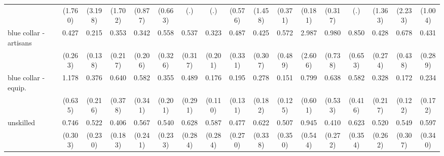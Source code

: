{\begin{tabular}{l*{16}{c}}
                    &     (1.760)         &     (3.198)         &     (1.702)         &     (0.877)         &     (0.663)         &         (.)         &         (.)         &     (0.576)         &     (1.458)         &     (0.371)         &     (0.181)         &     (0.317)         &         (.)         &     (1.363)         &     (2.233)         &     (1.004)         \\
[1em]
blue collar - artisans&       0.427         &       0.215\sym{*}  &       0.353         &       0.342         &       0.558         &       0.537         &       0.323         &       0.487         &       0.425         &       0.572         &       2.987         &       0.980         &       0.850         &       0.428         &       0.678         &       0.431         \\
                    &     (0.263)         &     (0.138)         &     (0.217)         &     (0.206)         &     (0.326)         &     (0.317)         &     (0.201)         &     (0.331)         &     (0.307)         &     (0.489)         &     (2.606)         &     (0.738)         &     (0.653)         &     (0.274)         &     (0.438)         &     (0.289)         \\
[1em]
blue collar - equip.&       1.178         &       0.376         &       0.640         &       0.582         &       0.355         &       0.489         &       0.176\sym{**} &       0.195\sym{*}  &       0.278         &       0.151\sym{*}  &       0.799         &       0.638         &       0.582         &       0.328         &       0.172\sym{*}  &       0.234\sym{*}  \\
                    &     (0.635)         &     (0.216)         &     (0.378)         &     (0.341)         &     (0.201)         &     (0.291)         &     (0.110)         &     (0.131)         &     (0.182)         &     (0.125)         &     (0.601)         &     (0.533)         &     (0.416)         &     (0.217)         &     (0.122)         &     (0.172)         \\
[1em]
unskilled           &       0.746         &       0.522         &       0.406\sym{*}  &       0.567         &       0.540         &       0.628         &       0.587         &       0.477         &       0.622         &       0.507         &       0.945         &       0.410         &       0.623         &       0.520         &       0.549         &       0.597         \\
                    &     (0.303)         &     (0.230)         &     (0.183)         &     (0.241)         &     (0.233)         &     (0.284)         &     (0.284)         &     (0.270)         &     (0.338)         &     (0.350)         &     (0.544)         &     (0.272)         &     (0.354)         &     (0.262)         &     (0.307)         &     (0.340)         \\

\end{tabular}}
